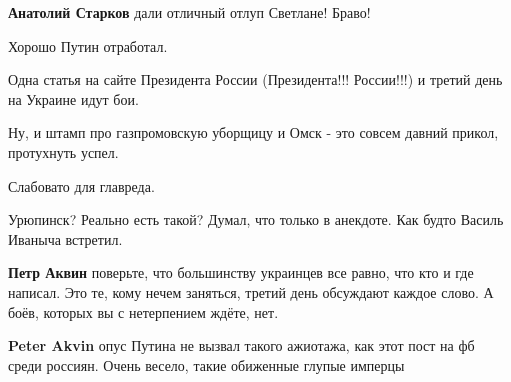 \begin{itemize}
\begin{itemize}
 
\textbf{Анатолий Старков} дали отличный отлуп Светлане! Браво!
\end{itemize}

 

Хорошо Путин отработал.

Одна статья на сайте Президента России (Президента!!! России!!!) и третий день на Украине идут бои.

Ну, и штамп про газпромовскую уборщицу и Омск - это совсем давний прикол, протухнуть успел.

Слабовато для главреда.

\begin{itemize}
 
Урюпинск? Реально есть такой? Думал, что только в анекдоте. Как будто Василь Иваныча встретил.

 
\textbf{Петр Аквин} поверьте, что большинству украинцев все равно, что кто и где написал. Это те, кому нечем заняться, третий день обсуждают каждое слово. А боёв, которых вы с нетерпением ждёте, нет.

 
\textbf{Peter Akvin} опус Путина не вызвал такого ажиотажа, как этот пост на фб среди россиян. Очень весело, такие обиженные глупые имперцы
\end{itemize}


\end{itemize}
